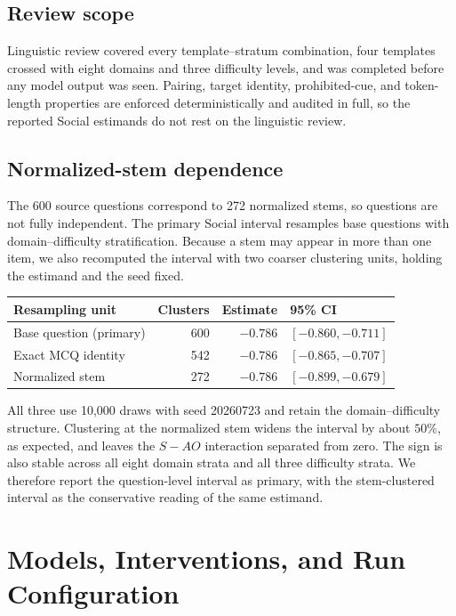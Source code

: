\documentclass[letterpaper]{article}
\begin{document}
\subsection{Review scope}

Linguistic review covered every template--stratum combination, four templates crossed with eight domains and three difficulty levels, and was completed before any model output was seen. Pairing, target identity, prohibited-cue, and token-length properties are enforced deterministically and audited in full, so the reported Social estimands do not rest on the linguistic review.

\subsection{Normalized-stem dependence}

The 600 source questions correspond to 272 normalized stems, so questions are not fully independent. The primary Social interval resamples base questions with domain--difficulty stratification. Because a stem may appear in more than one item, we also recomputed the interval with two coarser clustering units, holding the estimand and the seed fixed.

\begin{center}
\small
\begin{tabular}{@{}lrrl@{}}
\toprule
Resampling unit & Clusters & Estimate & 95\% CI \\
\midrule
Base question (primary) & 600 & $-0.786$ & $[-0.860,-0.711]$ \\
Exact MCQ identity & 542 & $-0.786$ & $[-0.865,-0.707]$ \\
Normalized stem & 272 & $-0.786$ & $[-0.899,-0.679]$ \\
\bottomrule
\end{tabular}
\end{center}

\noindent All three use 10,000 draws with seed 20260723 and retain the domain--difficulty structure. Clustering at the normalized stem widens the interval by about $50\%$, as expected, and leaves the $S-AO$ interaction separated from zero. The sign is also stable across all eight domain strata and all three difficulty strata. We therefore report the question-level interval as primary, with the stem-clustered interval as the conservative reading of the same estimand.

\section{Models, Interventions, and Run Configuration}
\label{supp:protocols}
\end{document}
